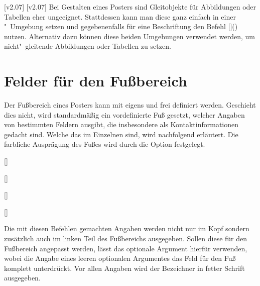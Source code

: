 \begin{DeclareEntity}{}
\begin{Declaration}
\begin{Declaration}
[v2.07]
[v2.07]
Bei Gestalten eines Posters sind Gleitobjekte für Abbildungen oder Tabellen 
eher ungeeignet. Stattdessen kann man diese ganz einfach in einer 
"~Umgebung setzen und gegebenenfalls für eine 
Beschriftung den Befehl
[]() 
nutzen. Alternativ dazu können diese beiden Umgebungen verwendet werden, um 
nicht"~gleitende Abbildungen oder Tabellen zu setzen.
\end{Declaration}
\end{Declaration}



\section{%
  Felder für den Fußbereich%
  \label{sec:poster:foot}%
}

Der Fußbereich eines Posters kann mit  eigens und frei 
definiert werden. Geschieht dies nicht, wird standardmäßig ein vordefinierte 
Fuß gesetzt, welcher Angaben von bestimmten Feldern ausgibt, die insbesondere 
als Kontaktinformationen gedacht sind. Welche das im Einzelnen sind, wird 
nachfolgend erläutert. Die farbliche Ausprägung des Fußes wird durch die Option
 festgelegt.

\begin{Declaration}
  {[]}
\begin{Declaration}
  {[]}
\begin{Declaration}
  {[]}
\begin{Declaration}
  {[]}
\printdeclarationlist

Die mit diesen Befehlen gemachten Angaben werden nicht nur im Kopf sondern 
zusätzlich auch im linken Teil des Fußbereichs ausgegeben. Sollen diese für den 
Fußbereich angepasst werden, lässt das optionale Argument hierfür verwenden, 
wobei die Angabe eines leeren optionalen Argumentes das Feld für den Fuß 
komplett unterdrückt. Vor allen Angaben wird der Bezeichner  
in fetter Schrift ausgegeben.
\end{Declaration}
\end{Declaration}
\end{Declaration}
\end{Declaration}



\end{DeclareEntity}

